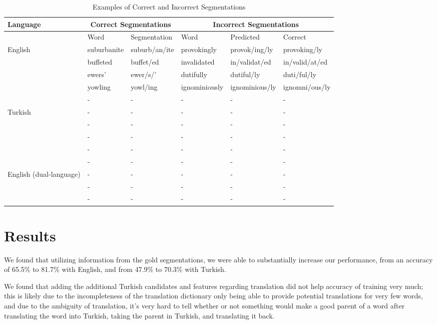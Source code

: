 \documentclass[11pt,twocolumn]{article}
\begin{document}
\begin{table*}
    \begin{center}
        \begin{tabular}{ | l | l | l | l | l | l |}
            \hline
            Language & \multicolumn{2}{|c|}{\textbf{Correct Segmentations}} & \multicolumn{3}{|c|}{\textbf{Incorrect Segmentations}}\\ \hline
                     & Word & Segmentation & Word & Predicted & Correct\\ \hline
            English & suburbanite & suburb/an/ite & provokingly & provok/ing/ly & provoking/ly  \\ 
                    & buffeted & buffet/ed & invalidated  & in/validat/ed & in/valid/at/ed \\ 
                    & ewers' &  ewer/s/' & dutifully & dutiful/ly & duti/ful/ly\\ 
                    & yowling & yowl/ing & ignominiously & ignominious/ly& ignomni/ous/ly \\ 
            \hline
                    & - & - & - & - & -\\ 
            Turkish & - & - & - & - & -\\ 
                    & - & - & - & - & -\\ 
                    & - & - & - & - & -\\ \hline
                    & - & - & - & -  & -\\ 
                    & - & - & - & -  & -\\ 
    English (dual-language) & - & - & - & -  & -\\ 
                    & - & - & - & -  & -\\ 
                    & - & - & - & -  & -\\ \hline
                \end{tabular}
        \caption{Examples of Correct and Incorrect Segmentations}
    \end{center}
\end{table*}

\section{Results}
We found that utilizing information from the gold segmentations, we were able to substantially increase our
performance, from an accuracy of 65.5\% to 81.7\% with English, and from 47.9\% to 70.3\% with Turkish.

We found that adding the additional Turkish candidates and features regarding translation
did not help accuracy of training very much; this is likely due to the incompleteness of the translation
dictionary only being able to provide potential translations for very few words, and due to the ambiguity
of translation, it's very hard to tell whether or not something would make a good parent of a word after
translating the word into Turkish, taking the parent in Turkish, and translating it back.


\end{document}
